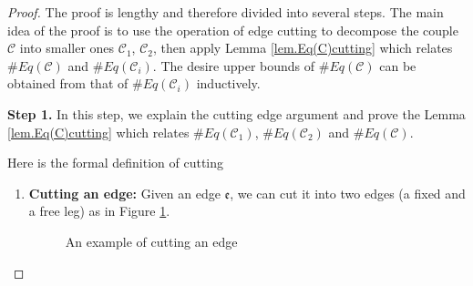 \begin{proof} 
The proof is lengthy and therefore divided into several steps. The main idea of the proof is to use the operation of edge cutting to decompose the couple $\mathcal{C}$ into smaller ones $\mathcal{C}_1$, $\mathcal{C}_2$, then apply Lemma \ref{lem.Eq(C)cutting} which relates $\#Eq(\mathcal{C})$ and $\#Eq(\mathcal{C}_i)$. The desire upper bounds of $\#Eq(\mathcal{C})$ can be obtained from that of $\#Eq(\mathcal{C}_i)$ inductively.


\textbf{Step 1.} In this step, we explain the cutting edge argument and prove the Lemma \ref{lem.Eq(C)cutting} which relates $\#Eq(\mathcal{C}_1)$, $\#Eq(\mathcal{C}_2)$ and $\#Eq(\mathcal{C})$.

Here is the formal definition of cutting 

\begin{defn}
\begin{enumerate}
    \item \textbf{Cutting an edge:} Given an edge $\mathfrak{e}$, we can cut it into two edges (a fixed and a free leg) as in Figure \ref{fig.cutedge}.
    
   \begin{figure}[H]
    \centering
        \caption{An example of cutting an edge}
        \label{fig.cutedge}
    \end{figure}


\end{enumerate}
\end{defn}
\end{proof}
